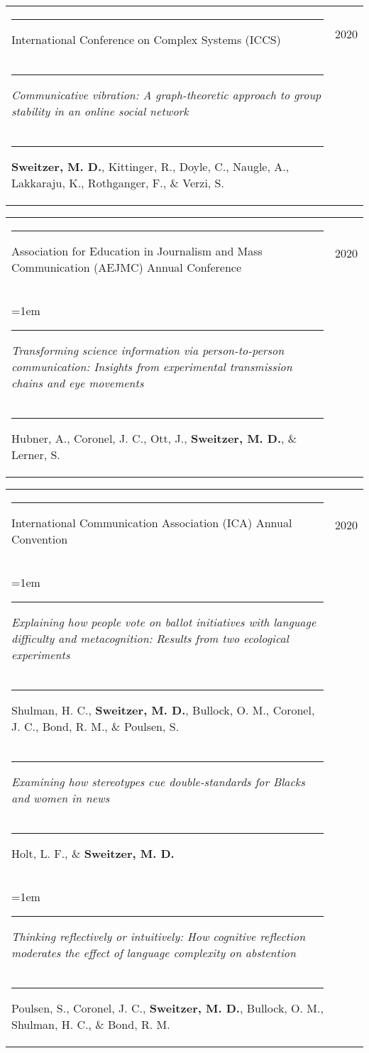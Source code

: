 \documentclass[letterpaper, 10pt]{extarticle}
\begin{document}
\vspace{0.5em}
\begin{tabularx}{\textwidth}{Xr}
\rule{0.5em}{0pt}{\small International Conference on Complex Systems (ICCS)} & {\small 2020}\vspace{0.25em}\\
\rule{1em}{0pt}{\raggedright \small \textit{Communicative vibration: A graph-theoretic approach to group stability in an online social network}}\\
\rule{1.25em}{0pt}{\small \textbf{Sweitzer, M. D.}, Kittinger, R., Doyle, C., Naugle, A., Lakkaraju, K., Rothganger, F., \& Verzi, S.}
\end{tabularx}

\vspace{0.5em}
\begin{tabularx}{\textwidth}{Xr}
\rule{0.5em}{0pt}{\small Association for Education in Journalism and Mass Communication (AEJMC) Annual Conference} & {\small 2020}\vspace{0.25em}\\
\hangindent=1em \rule{1em}{0pt}{\raggedright \small \textit{Transforming science information via person-to-person communication: Insights from experimental transmission chains and eye movements}}\\
\rule{1.25em}{0pt}{\small Hubner, A., Coronel, J. C., Ott, J., \textbf{Sweitzer, M. D.}, \& Lerner, S.}
\end{tabularx}

\vspace{0.5em}
\begin{tabularx}{\textwidth}{Xr}
\rule{0.5em}{0pt}{\small International Communication Association (ICA) Annual Convention} & {\small 2020}\vspace{0.25em}\\
\hangindent=1em \rule{1em}{0pt}{\raggedright \small \textit{Explaining how people vote on ballot initiatives with language difficulty and metacognition: Results from two ecological experiments}}\\
\rule{1.25em}{0pt}{\small Shulman, H. C., \textbf{Sweitzer, M. D.}, Bullock, O. M., Coronel, J. C., Bond, R. M., \& Poulsen, S.}\vspace{0.5em}\\

\rule{1em}{0pt}{\raggedright \small \textit{Examining how stereotypes cue double-standards for Blacks and women in news}}\\
\rule{1.25em}{0pt}{\small Holt, L. F., \& \textbf{Sweitzer, M. D.}}\vspace{0.5em}\\

\hangindent=1em \rule{1em}{0pt}{\raggedright \small \textit{Thinking reflectively or intuitively: How cognitive reflection moderates the effect of language complexity on abstention}}\\
\rule{1.25em}{0pt}{\small Poulsen, S., Coronel, J. C., \textbf{Sweitzer, M. D.}, Bullock, O. M., Shulman, H. C., \& Bond, R. M.}
\end{tabularx}
\end{document}
